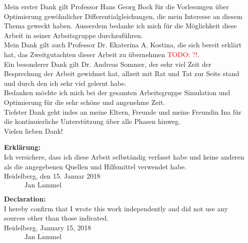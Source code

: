 \documentclass{scrartcl}[12pt, halfparskip]
\numberwithin{equation}{section}
\numberwithin{figure}{section}
\numberwithin{table}{section}
\newcommand{\todo}[1]{\textcolor{red}{TODO: #1}}
\begin{document}
\newpage
{}

Mein erster Dank gilt Professor Hans Georg Bock für die Vorlesungen über Optimierung gewöhnlicher Differentialgleichungen, die mein Interesse an diesem Thema geweckt haben. Ausserdem bedanke ich mich für die Möglichkeit diese Arbeit in seiner Arbeitsgruppe durchzuführen. \\

Mein Dank gilt auch Professor Dr. Ekaterina A. Kostina, die sich bereit erklärt hat, das Zweitgutachten dieser Arbeit zu übernehmen \todo{?!}. \\ 

Ein besonderer Dank gilt Dr. Andreas Sommer, der sehr viel Zeit der Besprechung der Arbeit gewidmet hat, allzeit mit Rat und Tat zur Seite stand und durch den ich sehr viel gelernt habe.\\

Bedanken möchte ich mich bei der gesamten Arbeitsgruppe Simulation und Optimierung für die sehr schöne und angenehme Zeit. \\

 

Tiefster Dank geht indes an meine Eltern, Freunde und meine Freundin Ina für die kontinuierliche Unterstützung über alle Phasen hinweg. \\

Vielen lieben Dank!


\newpage
\textbf{Erklärung:} \\[3ex]
Ich versichere, dass ich diese Arbeit selbständig verfasst habe und keine anderen als die angegebenen Quellen und Hilfsmittel verwendet habe.\\[2ex]

Heidelberg, den 15. Januar 2018 \\[6ex]

$\overline{\qquad \quad \text{Jan Lammel} \quad \qquad}$


\vspace{5cm}

\textbf{Declaration:} \\[3ex]
I hereby confirm that I wrote this work independently and did not use any sources other than those indicated.\\[2ex]

Heidelberg, January 15, 2018 \\[6ex]

$\overline{\qquad \quad \text{Jan Lammel} \quad \qquad}$
\end{document}
